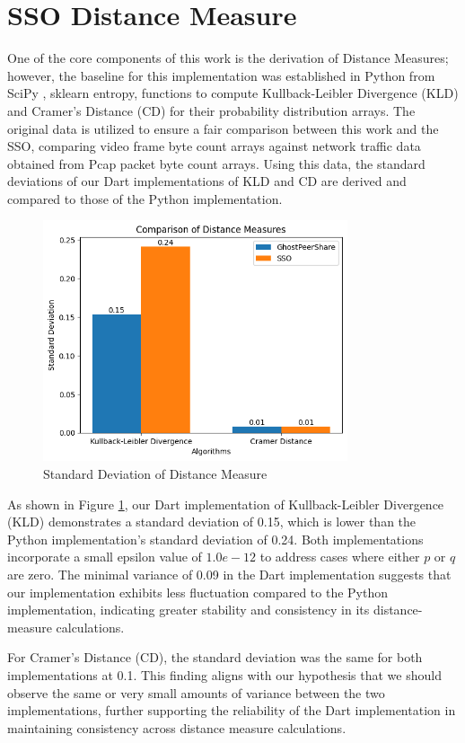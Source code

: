 \section{SSO Distance Measure}
\label{sec:SSO Distance Measure}
One of the core components of this work is the derivation of Distance Measures; however, the baseline for this implementation was established in Python from SciPy \cite{2020SciPy-NMeth}, sklearn entropy, functions to compute Kullback-Leibler Divergence (KLD) and Cramer’s Distance (CD) for their probability distribution arrays. The original data is utilized to ensure a fair comparison between this work and the SSO, comparing video frame byte count arrays against network traffic data obtained from Pcap packet byte count arrays. Using this data, the standard deviations of our Dart implementations of KLD and CD are derived and compared to those of the Python implementation.

\begin{figure}[t]
    \centering
    \includegraphics[width=0.8\textwidth]{5 Results/Figures/5.2 Bar Chart.png}
    \caption{Standard Deviation of Distance Measure}
    \label{fig:sso-distance-measure}
\end{figure}

As shown in Figure \ref{fig:sso-distance-measure}, our Dart implementation of Kullback-Leibler Divergence (KLD) demonstrates a standard deviation of 0.15, which is lower than the Python implementation’s standard deviation of 0.24. Both implementations incorporate a small epsilon value of $1.0e-12$ to address cases where either $p$ or $q$ are zero. The minimal variance of 0.09 in the Dart implementation suggests that our implementation exhibits less fluctuation compared to the Python implementation, indicating greater stability and consistency in its distance-measure calculations.

For Cramer's Distance (CD), the standard deviation was the same for both implementations at 0.1. This finding aligns with our hypothesis that we should observe the same or very small amounts of variance between the two implementations, further supporting the reliability of the Dart implementation in maintaining consistency across distance measure calculations.
